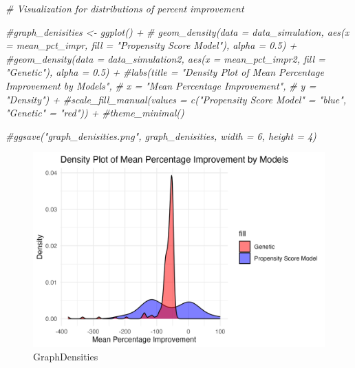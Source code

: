 \documentclass[
]{article}
\newenvironment{Shaded}{\begin{snugshade}}{\end{snugshade}}
\newcommand{\CommentTok}[1]{\textcolor[rgb]{0.56,0.35,0.01}{\textit{#1}}}
\begin{document}
\begin{Shaded}
\end{Shaded}

\begin{Shaded}
\begin{Highlighting}[]
\CommentTok{\# Visualization for distributions of percent improvement}

\CommentTok{\#graph\_denisities \textless{}{-} ggplot() +}
 \CommentTok{\# geom\_density(data = data\_simulation, aes(x = mean\_pct\_impr, fill = "Propensity Score Model"), alpha = 0.5) +}
  \CommentTok{\#geom\_density(data = data\_simulation2, aes(x = mean\_pct\_impr2, fill = "Genetic"), alpha = 0.5) +}
  \CommentTok{\#labs(title = "Density Plot of Mean Percentage Improvement by Models", }
   \CommentTok{\#    x = "Mean Percentage Improvement", }
    \CommentTok{\# y = "Density") +}
  \CommentTok{\#scale\_fill\_manual(values = c("Propensity Score Model" = "blue", "Genetic" = "red")) +}
  \CommentTok{\#theme\_minimal() }
  
\CommentTok{\#ggsave("graph\_denisities.png", graph\_denisities, width = 6, height = 4)}
\end{Highlighting}
\end{Shaded}

\begin{figure}
\centering
\includegraphics{graph_denisities.png}
\caption{GraphDensities}
\end{figure}
\end{document}
